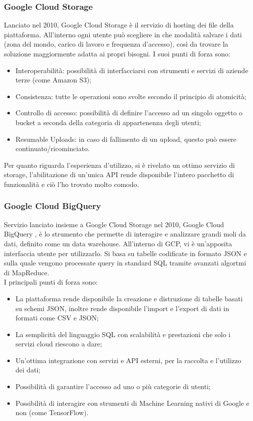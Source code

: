 \subsubsection{Google Cloud Storage}
Lanciato nel 2010, Google Cloud Storage è il servizio di hosting dei file della piattaforma. All'interno ogni utente può scegliere in che modalità salvare i dati (zona del mondo, carico di lavoro e frequenza d'accesso), così da trovare la soluzione maggiormente adatta ai propri bisogni.
I suoi punti di forza sono:
\begin{itemize}
	\item Interoperabilità: possibilità di interfacciarsi con strumenti e servizi di aziende terze (come Amazon S3);
	\item Consistenza: tutte le operazioni sono svolte secondo il principio di \gls{atomicità};
	\item Controllo di accesso: possibilità di definire l'accesso ad un singolo oggetto o \gls{bucket} a seconda della categoria di appartenenza degli utenti;
	\item Resumable Uploads: in caso di fallimento di un upload, questo può essere continuato/ricominciato.
\end{itemize}

Per quanto riguarda l'esperienza d'utilizzo, si è rivelato un ottimo servizio di storage, l'abilitazione di un'unica API rende disponibile l'intero pacchetto di funzionalità e ciò l'ho trovato molto comodo.
\subsubsection{Google Cloud BigQuery}
Servizio lanciato insieme a Google Cloud Storage nel 2010, Google Cloud BigQuery , è lo strumento che permette di interagire e analizzare grandi moli da dati, definito come un \gls{data warehouse}. All'interno di GCP, vi è un'apposita interfaccia utente per utilizzarlo. Si basa su tabelle codificate in formato JSON e sulla quale vengono processate query in standard SQL \cite{standardSQL} tramite avanzati algortmi di \gls{MapReduce}.
\\I principali punti di forza sono:
\begin{itemize}
	\item La piattaforma rende disponibile la creazione e distruzione di tabelle basati su schemi JSON, inoltre rende disponibile l'import e l'export di dati in formati come CSV e JSON;
	\item La semplicità del linguaggio SQL con scalabilità e prestazioni che solo i servizi cloud riescono a dare;
	\item Un'ottima integrazione con servizi e API esterni, per la raccolta e l'utilizzo dei dati;
	\item Possibilità di garantire l'accesso ad uno o più categorie di utenti;
	\item Possibilità di interagire con strumenti di Machine Learning nativi di Google e non (come TensorFlow).
\end{itemize}

